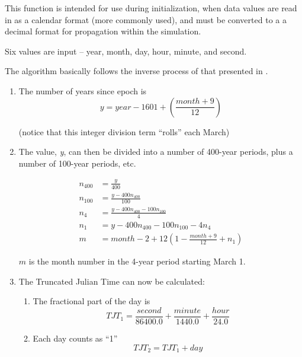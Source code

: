 {\begin{enumerate}
{\begin{enumerate}
\label{ref:convertfromcalendar}This function is intended for use during
initialization, when data values are read in as a calendar format (more
commonly used), and must be converted to a a decimal format for
propagation within the simulation.




Six values are input -- year, month, day, hour, minute, and second.

The algorithm basically follows the inverse process of that presented in
.


\begin{enumerate}
\item The number of years since epoch is 
\begin{equation*}
y={year}-1601+\left(\frac{{month}+9}{12}\right)
\end{equation*}

(notice that this integer division term
{\textquotedblleft}rolls{\textquotedblright} each March)
\item The value, \textit{y}, can then be divided into a number of
400-year periods, plus a number of 100-year periods, etc.  

\begin{align*}
n_{400} &=\frac{y}{400} \\
n_{100} &=\frac{y-400n_{400}}{100} \\
n_{4} &=\frac{y-400n_{400}-100n_{100}}{4} \\
n_{1} &=y-400n_{400}-100n_{100}-4n_{4}  \\
m &={month}-2+12\left(1-\frac{{month}+9}{12}+n_{1}\right)
\end{align*}

$m$ is the month number in the 4-year period starting March 1.


\item The Truncated Julian Time can now be calculated:

\begin{enumerate}
\item The fractional part of the day is\ \ 
\begin{equation*}
{TJT}_{1}=\frac{{second}}{86400.0}+\frac{{minute}}{1440.0}+\frac{{hour}}{24.0}
\end{equation*}

\item Each day counts as {\textquotedblleft}1{\textquotedblright}
\begin{equation*}
{TJT}_{2}={TJT}_{1}+{day}
\end{equation*}


\end{enumerate}
\end{enumerate}
\end{enumerate}}
\end{enumerate}}
